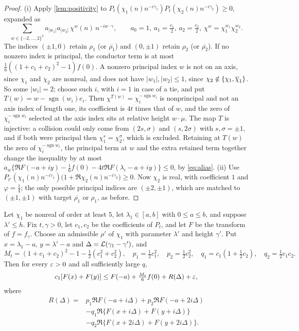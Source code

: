 \begin{proof}
(i) Apply \cref{lem:positivity} to $P_t(\chi_1(n)n^{-i\gamma_1})P_t(\chi_2(n)n^{-i\gamma_2})\ge0$, expanded as
\[
  \sum_{w\in\{-2,\dots,2\}^2}a_{|w_1|}a_{|w_2|}\,\chi^w(n)\,n^{-iw\cdot\gamma},\qquad
  a_0=1,\ a_1=\tfrac{c_1}2,\ a_2=\tfrac{c_2}2,\ \chi^w=\chi_1^{w_1}\chi_2^{w_2}.
\] The indices $(\pm1,0)$ retain $\rho_1$ (or $\overline{\rho_1}$) and $(0,\pm1)$ retain $\rho_2$
(or $\overline{\rho_2}$). If no nonzero index is principal, the conductor term is at most
$\frac16((1+c_1+c_2)^2-1)f(0)$. A nonzero principal index $w$ is not on an axis, since $\chi_1$ and $\chi_2$
are nonreal, and does not have $|w_1|,|w_2|\le1$, since $\chi_2\notin\{\chi_1,\overline{\chi}_1\}$. So some $|w_i|=2$;
choose such $i$, with $i=1$ in case of a tie, and put $T(w)=w-\operatorname{sgn}(w_i)e_i$. Then
$\chi^{T(w)}=\chi_i^{-\operatorname{sgn}w_i}$ is nonprincipal and not an axis index of length one, its
coefficient is $4t$ times that of $w$, and the zero of $\chi_i^{-\operatorname{sgn}w_i}$ selected at the axis
index sits at relative height $w\cdot\mu$. The map $T$ is injective: a collision could only come from
$(2s,\sigma)$ and $(s,2\sigma)$ with $s,\sigma=\pm1$, and if both were principal then $\chi_1^s=\chi_2^\sigma$,
which is excluded. Retaining at $T(w)$ the zero of $\chi_i^{-\operatorname{sgn}w_i}$, the principal term at $w$
and the extra retained term together change the inequality by at most
$a_w\{\Re F(-a+iy)-\frac16f(0)-4t\Re F(\lambda_i-a+iy)\}\le0$, by \eqref{eq:alias}. (ii) Use
$P_{t'}(\chi_1(n)n^{-i\gamma_1})\bigl(1+\Re\chi_2(n)n^{-i\gamma_2}\bigr)\ge0$. Now $\chi_2$ is real, with coefficient
$1$ and $\varphi=\frac14$; the only possible principal indices are $(\pm2,\pm1)$, which are matched to
$(\pm1,\pm1)$ with target $\overline{\rho_1}$ or $\rho_1$, as before.
\end{proof}

\begin{proposition}\label{prop:polyrows}
Let $\chi_1$ be nonreal of order at least $5$, let $\lambda_1\in[a,b]$ with $0\le a\le b$, and suppose
$\lambda'\le h$. Fix $t,\gamma>0$, let $c_1,c_2$ be the coefficients of $P_t$, and let
$F$ be the transform of $f=f_\gamma$. Choose an admissible $\rho'$ of $\chi_1$ with
parameter $\lambda'$ and height $\gamma'$. Put
$x=\lambda_1-a$, $y=\lambda'-a$ and $\Delta=\mathcal{L}(\gamma_1-\gamma')$, and
\[
  M_t=(1+c_1+c_2)^2-1-\tfrac12(c_1^2+c_2^2),\quad p_1=\tfrac12c_1^2,\quad p_2=\tfrac12c_2^2,\quad
  q_1=c_1(1+\tfrac12c_2),\quad q_2=\tfrac12c_1c_2 .
\]
Then for every $\varepsilon>0$ and all sufficiently large $q$,
\[
  c_1[F(x)+F(y)]\le F(-a)+\tfrac{M_t}6f(0)+R(\Delta)+\varepsilon,
\]
where
\begin{align*}
 R(\Delta)={}&p_1\Re F(-a+i\Delta)+p_2\Re F(-a+2i\Delta)\\
 &-q_1\Re\{F(x+i\Delta)+F(y+i\Delta)\}\\
 &-q_2\Re\{F(x+2i\Delta)+F(y+2i\Delta)\}.
\end{align*}
\end{proposition}


